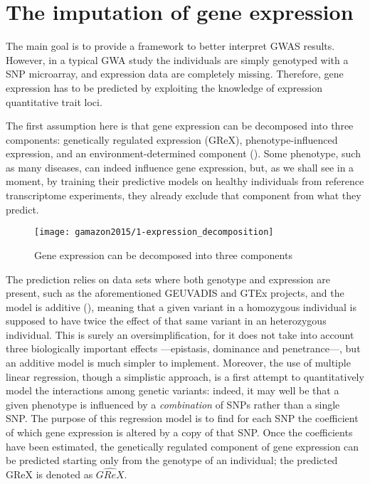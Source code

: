\documentclass[../main.tex]{subfiles}
\begin{document}
\section{The imputation of gene expression}

The main goal is to provide a framework to better interpret GWAS 
results. However, in a typical GWA study the individuals are simply 
genotyped with a SNP microarray, and expression data are completely 
missing. Therefore, gene expression has to be predicted by exploiting 
the knowledge of expression quantitative trait loci.

The first assumption here is that gene expression can be decomposed into 
three components: genetically regulated expression (GReX), 
phenotype-influenced expression, and an environment-determined component 
(). Some phenotype, such as many diseases, can 
indeed influence gene expression, but, as we shall see in a moment, by 
training their predictive models on healthy individuals from reference 
transcriptome experiments, they already exclude that component from what 
they predict.

\begin{figure}
	\texttt{[image: gamazon2015/1-expression\_decomposition]}
	\caption{Gene expression can be decomposed into three components}
\end{figure}

The prediction relies on data sets where both genotype and expression 
are present, such as the aforementioned GEUVADIS and GTEx projects, and 
the model is additive (), meaning that a given 
variant in a homozygous individual is supposed to have twice the effect 
of that same variant in an heterozygous individual. This is surely an 
oversimplification, for it does not take into account three biologically 
important effects ---epistasis, dominance and penetrance---, but an 
additive model is much simpler to implement. Moreover, the use of 
multiple linear regression, though a simplistic approach, is a first 
attempt to quantitatively model the interactions among genetic variants: 
indeed, it may well be that a given phenotype is influenced by a 
\textit{combination} of SNPs rather than a single SNP. The purpose of this regression model is to 
find for each SNP the coefficient of which gene expression is altered by 
a copy of that SNP. Once the coefficients have been estimated, the 
genetically regulated component of gene expression can be predicted 
starting only from the genotype of an individual; the predicted GReX is 
denoted as $\hat{GReX}$.
\end{document}
